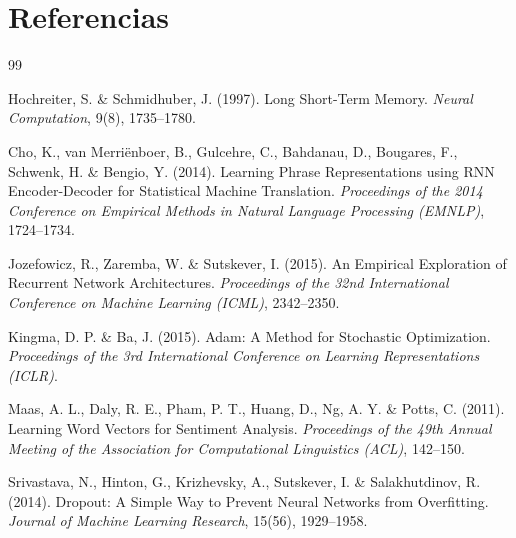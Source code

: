
\section{Referencias}

\begin{thebibliography}{99}

Hochreiter, S. \& Schmidhuber, J. (1997).
Long Short-Term Memory.
\textit{Neural Computation}, 9(8), 1735--1780.

Cho, K., van Merriënboer, B., Gulcehre, C., Bahdanau, D., Bougares, F., Schwenk, H. \& Bengio, Y. (2014).
Learning Phrase Representations using RNN Encoder-Decoder for Statistical Machine Translation.
\textit{Proceedings of the 2014 Conference on Empirical Methods in Natural Language Processing (EMNLP)}, 1724--1734.

Jozefowicz, R., Zaremba, W. \& Sutskever, I. (2015).
An Empirical Exploration of Recurrent Network Architectures.
\textit{Proceedings of the 32nd International Conference on Machine Learning (ICML)}, 2342--2350.

Kingma, D. P. \& Ba, J. (2015).
Adam: A Method for Stochastic Optimization.
\textit{Proceedings of the 3rd International Conference on Learning Representations (ICLR)}.

Maas, A. L., Daly, R. E., Pham, P. T., Huang, D., Ng, A. Y. \& Potts, C. (2011).
Learning Word Vectors for Sentiment Analysis.
\textit{Proceedings of the 49th Annual Meeting of the Association for Computational Linguistics (ACL)}, 142--150.

Srivastava, N., Hinton, G., Krizhevsky, A., Sutskever, I. \& Salakhutdinov, R. (2014).
Dropout: A Simple Way to Prevent Neural Networks from Overfitting.
\textit{Journal of Machine Learning Research}, 15(56), 1929--1958.

\end{thebibliography}
